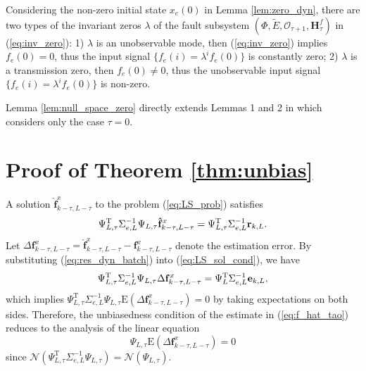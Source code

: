 \documentclass[twocolumn]{autart}
\begin{document}
\begin{lem}\label{lem:null_space_zero}
Considering the non-zero initial state $x_e(0)$ in Lemma \ref{lem:zero_dyn}, there are two types of the invariant zeros $\lambda$ of the fault subsystem
$( \Phi, \tilde E, \mathcal{O}_{\tau+1}, \mathbf{H}_{\tau}^f )$ in (\ref{eq:inv_zero}): 1) 
$\lambda$ is an unobservable mode, then (\ref{eq:inv_zero}) implies $f_e(0)=0$, thus the input signal $\{f_e(i) = \lambda^i f_e(0)\}$ is constantly zero; 2) $\lambda$ is a transmission zero, then $f_e(0) \ne 0$, thus the  unobservable input signal $\{f_e(i) = \lambda^i f_e(0)\}$ is non-zero. 
\end{lem}


Lemma \ref{lem:null_space_zero} directly extends Lemmas 1 and 2 in \cite{Wan2014} which considers only the case $\tau = 0$. 


\section{Proof of Theorem \ref{thm:unbias}}\label{app:thm_unbias}

A solution ${{\mathbf{\hat {{f}}}}_{k-\tau,L-\tau}^x}$ to the problem (\ref{eq:LS_prob}) satisfies
\begin{equation}\label{eq:LS_sol_cond}
\Psi_{L,\tau}^\mathrm{T} \Sigma_{e,L}^{-1} \Psi_{L,\tau} {{\mathbf{\hat {{f}}}}_{k-\tau,L-\tau}^x} =
\Psi_{L,\tau}^\mathrm{T} \Sigma_{e,L}^{-1} {{\bf{r}}_{k,L}}.
\end{equation}
Let $\Delta {{\mathbf{{{f}}}}_{k-\tau,L-\tau}^x} = {{\mathbf{\hat {{f}}}}_{k-\tau,L-\tau}^x} - {{\mathbf{{{f}}}}_{k-\tau,L-\tau}^x}$ denote the estimation error.
By substituting (\ref{eq:res_dyn_batch}) into (\ref{eq:LS_sol_cond}), we have
\begin{equation*}\label{eq:esterr}
\Psi_{L,\tau}^\mathrm{T} \Sigma_{e,L}^{-1} \Psi_{L,\tau} {\Delta {\mathbf{{{f}}}}_{k-\tau,L-\tau}^x} =
\Psi_L^\mathrm{T} \Sigma_{e,L}^{-1} {{\bf{e}}_{k,L}},
\end{equation*}
which implies
$\Psi_{L,\tau}^\mathrm{T} \Sigma_{e,L}^{-1} \Psi_{L,\tau} \mathrm{E}
\left( {\Delta {\mathbf{{{f}}}}_{k-\tau,L-\tau}^x} \right) = 0$
by taking expectations on both sides. Therefore, the unbiasedness condition of the estimate in (\ref{eq:f_hat_tao}) reduces to the analysis of the linear equation 
\begin{equation}\label{eq:fest_err_unbias}
	\Psi_{L,\tau}  \mathrm{E} \left( {\Delta {\mathbf{{{f}}}}_{k-\tau,L-\tau}^x} \right)= 0
\end{equation}
since 
$\mathcal{N}\left( \Psi_{L,\tau}^\mathrm{T} \Sigma_{e,L}^{-1} \Psi_{L,\tau} \right) = \mathcal{N}\left( \Psi_{L,\tau} \right)$. 
\end{document}
